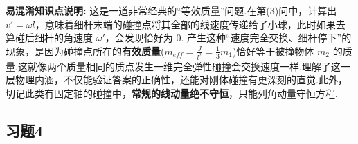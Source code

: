 \vspace{1em}

\textbf{易混淆知识点说明:}
这是一道非常经典的“等效质量”问题.在第(3)问中，计算出 $v' = \omega l$，意味着细杆末端的碰撞点将其全部的线速度传递给了小球，此时如果去算碰后细杆的角速度 $\omega'$，会发现恰好为 $0$.
产生这种“速度完全交换、细杆停下”的现象，是因为碰撞点所在的\textbf{有效质量}($m_{eff} = \frac{J}{l^2} = \frac{1}{3}m_1$)恰好等于被撞物体 $m_2$ 的质量.这就像两个质量相同的质点发生一维完全弹性碰撞会交换速度一样.理解了这一层物理内涵，不仅能验证答案的正确性，还能对刚体碰撞有更深刻的直觉.此外，切记此类有固定轴的碰撞中，\textbf{常规的线动量绝不守恒}，只能列角动量守恒方程.
	
\newpage
\subsection{习题4}

